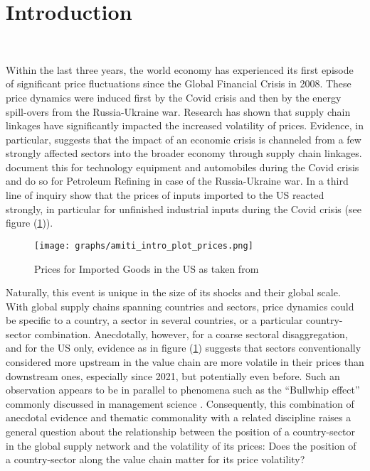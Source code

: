 \section{Introduction}\
\label{sec:intro}

Within the last three years, the world economy has experienced its first episode of significant price fluctuations since the Global 
Financial Crisis in 2008. These price dynamics were induced first by the Covid crisis and then by the energy spill-overs from the 
Russia-Ukraine war. Research has shown that supply chain linkages have significantly impacted the increased volatility of prices. Evidence, 
in particular, suggests that the impact of an economic crisis is channeled from a few strongly affected sectors into the broader economy
through supply chain linkages. \textcite{labelle2022GlobalSupplyChain} document this for technology equipment and automobiles during 
the Covid crisis and \textcite{minton2023DelayedInflationSupply} do so for Petroleum Refining in case of the Russia-Ukraine war. In a 
third line of inquiry \textcite{amiti2021HighImportPrices} show that the prices of inputs imported to the US reacted strongly, in 
particular for unfinished industrial inputs during the Covid crisis (see figure (\ref{fig:covid_imports})). 

\begin{figure}[H]
    \centering
    \texttt{[image: graphs/amiti\_intro\_plot\_prices.png]}
    \caption{\label{fig:covid_imports} Prices for Imported Goods in the US as taken from \textcite{amiti2021HighImportPrices}}
\end{figure}

Naturally, this event is unique in the size of its shocks and their global scale. With global supply chains spanning countries and 
sectors, price dynamics could be specific to a country, a sector in several countries, or a particular country-sector combination. Anecdotally,
however, for a coarse sectoral disaggregation, and for the US only, evidence as in figure (\ref{fig:covid_imports}) suggests
that sectors conventionally considered more upstream in the value chain are more volatile in their prices than downstream ones, especially since 
2021, but potentially even before. Such an observation appears to be in parallel to phenomena such as the ``Bullwhip effect'' commonly discussed in 
management science \parencite{sterman1989ModelingManagerialBehavior}. Consequently, this combination of anecdotal evidence and thematic commonality 
with a related discipline raises a general question about the relationship between the position of a country-sector in the 
global supply network and the volatility of its prices: Does the position of a country-sector along the value chain matter for its price 
volatility?

